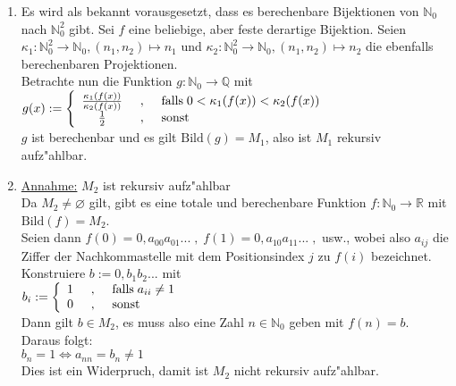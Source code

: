 \documentclass[10pt,oneside,onecolumn,a4paper,german,titlepage]{article}
\begin{document}
\begin{enumerate}
\item Es wird als bekannt vorausgesetzt, dass es berechenbare Bijektionen von
$\mathbb{N}_0$ nach $\mathbb{N}_0^2$ gibt. Sei $f$ eine beliebige, aber feste
derartige Bijektion. Seien $\kappa_1: \mathbb{N}_0^2 \to \mathbb{N}_0, (n_1,n_2)
\mapsto n_1$ und $\kappa_2: \mathbb{N}_0^2 \to \mathbb{N}_0, (n_1,n_2) \mapsto n_2$
die ebenfalls berechenbaren Projektionen.\\[4pt]
Betrachte nun die Funktion $g: \mathbb{N}_0 \to \mathbb{Q}$ mit\\
$g(x) := \left\{
\begin{array}{c@{\hspace{0.5cm},\hspace{0.5cm}}l}
\frac{\kappa_1(f(x))}{\kappa_2(f(x))} & \mbox{falls} \; 
0 < \kappa_1(f(x)) < \kappa_2(f(x)) \\
\frac{1}{2} & \mbox{sonst}
\end{array}
\right.$\\[4pt]
$g$ ist berechenbar und es gilt $\mbox{Bild}(g) = M_1$, also ist $M_1$
rekursiv aufz"ahlbar.
\item \underline{Annahme:} $M_2$ ist rekursiv aufz"ahlbar\\
Da $M_2 \not= \varnothing$ gilt, gibt es eine totale und berechenbare Funktion
$f: \mathbb{N}_0 \to \mathbb{R}$ mit $\mbox{Bild}(f) = M_2$.\\
Seien dann $f(0) = 0,a_{00}a_{01}... \; , \; f(1) = 0,a_{10}a_{11}... \; ,$ usw.,
wobei also $a_{ij}$ die Ziffer der Nachkommastelle mit dem Positionsindex $j$ zu
$f(i)$ bezeichnet.\\[4pt]
Konstruiere $b := 0,b_1b_2...$ mit\\
$b_i := \left\{
\begin{array}{c@{\hspace{0.5cm},\hspace{0.5cm}}l}
1 & \mbox{falls} \; a_{ii} \neq 1 \\
0 & \mbox{sonst}
\end{array}
\right.$\\[4pt]
Dann gilt $b \in M_2$, es muss also eine Zahl $n \in \mathbb{N}_0$ geben mit
$f(n) = b$. Daraus folgt:\\
$b_n = 1 \Leftrightarrow a_{nn} = b_n \neq 1$\\
Dies ist ein Widerpruch, damit ist $M_2$ nicht rekursiv aufz"ahlbar.
\end{enumerate}
\end{document}
